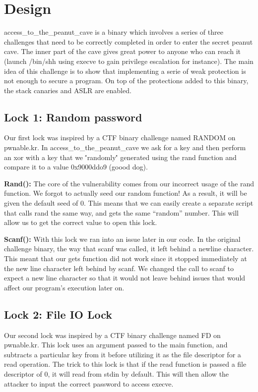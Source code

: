 \section{Design}
access\_to\_the\_peanut\_cave is a binary which involves a series of three challenges that need to be correctly completed in order to enter the secret peanut cave. The inner part of the cave gives great power to anyone who can reach it (launch /bin/shh using execve to gain privilege escalation for instance). The main idea of this challenge is to show that implementing a serie of weak protection is not enough to secure a program. On top of the protections added to this binary, the stack canaries and ASLR are enabled.

\subsection {Lock 1: Random password}
Our first lock was inspired by a CTF binary challenge named RANDOM on pwnable.kr. In access\_to\_the\_peanut\_cave we ask for a key and then perform an xor with a key that we \''randomly\'' generated using the rand function and compare it to a value 0x9000ddo9 (goood dog). 

\textbf{Rand():} The core of the vulnerability comes from our incorrect usage of the rand function. We forgot to actually seed our random function! As a result, it will be given the default seed of 0. This means that we can easily create a separate script that calls rand the same way, and gets the same ``random'' number. This will allow us to get the correct value to open this lock. 

\textbf{Scanf():} With this lock we ran into an issue later in our code. In the original challenge binary, the way that scanf was called, it left behind a newline character. This meant that our gets function did not work since it stopped immediately at the new line character left behind by scanf. We changed the call to scanf to expect a new line character so that it would not leave behind issues that would affect our program's execution later on.

\subsection{Lock 2: File IO Lock}
Our second lock was inspired by a CTF binary challenge named FD on pwnable.kr. This lock uses an argument passed to the main function, and subtracts a particular key from it before utilizing it as the file descriptor for a read operation. The trick to this lock is that if the read function is passed a file descriptor of 0, it will read from stdin by default. This will then allow the attacker to input the correct password to access execve.

